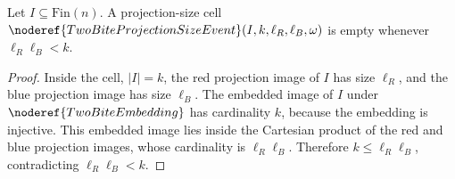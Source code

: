 \begin{helper}
Let \(I\subseteq\mathrm{Fin}(n)\).  A projection-size cell
\(\noderef{TwoBiteProjectionSizeEvent}(I,k,\ell_R,\ell_B,\omega)\) is empty
whenever \(\ell_R\ell_B<k\).
\end{helper}
\begin{proof}
Inside the cell, \(|I|=k\), the red projection image of \(I\) has size
\(\ell_R\), and the blue projection image has size \(\ell_B\).  The embedded
image of \(I\) under \(\noderef{TwoBiteEmbedding}\) has cardinality \(k\),
because the embedding is injective.  This embedded image lies inside the
Cartesian product of the red and blue projection images, whose cardinality is
\(\ell_R\ell_B\).  Therefore \(k\le \ell_R\ell_B\), contradicting
\(\ell_R\ell_B<k\).
\end{proof}
